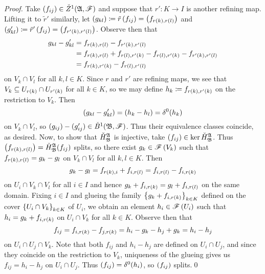 \documentclass[../Moduli_Spaces_of_Riemann_Surfaces.tex]{subfiles}
\begin{document}
    \begin{proof}
        Take $\left(f_{ij}\right)\in\check{Z}^1\!\left(\mathfrak{A},\mathscr{F}\right)$ and suppose that $r':K\to I$ is another refining map. Lifting it to $\tilde{r}'$ similarly, let $\left(g_{kl}\right)\coloneqq\tilde{r}\left(f_{ij}\right)=\left(f_{r\left(k\right),r\left(l\right)}\right)$ and $(g'_{kl})\coloneqq\tilde{r}'\left(f_{ij}\right)=\left(f_{r'\left(k\right),r'\left(l\right)}\right)$. Observe then that
        \begin{equation*}
            \begin{aligned}
                g_{kl}-g_{kl}'&=f_{r\left(k\right),r\left(l\right)}-f_{r'\left(k\right),r'\left(l\right)} \\
                              &=f_{r\left(k\right),r\left(l\right)}+f_{r\left(l\right),r'\left(k\right)}-f_{r\left(l\right),r'\left(k\right)}-f_{r'\left(k\right),r'\left(l\right)} \\
                              &=f_{r\left(k\right),r'\left(k\right)}-f_{r\left(l\right),r'\left(l\right)}
            \end{aligned}
        \end{equation*}
        on $V_k\cap V_l$ for all $k,l\in K$. Since $r$ and $r'$ are refining maps, we see that $V_k\subseteq U_{r\left(k\right)}\cap U_{r'\left(k\right)}$ for all $k\in K$, so we may define $h_k\coloneqq f_{r\left(k\right),r'\left(k\right)}$ on the restriction to $V_k$. Then
        \begin{equation*}
            \left(g_{kl}-g_{kl}'\right)=\left(h_k-h_l\right)=\delta^0\!\left(h_k\right)
        \end{equation*}
        on $V_k\cap V_l$, so $\left(g_{ij}\right)-(g_{ij}')\in\check{B}^1\!\left(\mathfrak{B},\mathscr{F}\right)$. Thus their equivalence classes coincide, as desired. Now, to show that $\check{H}_{\mathfrak{B}}^{\mathfrak{A}}$ is injective, take $\left(f_{ij}\right)\in\ker\check{H}_{\mathfrak{B}}^{\mathfrak{A}}$. Thus $\left(f_{r\left(k\right),r\left(l\right)}\right)=\check{H}_{\mathfrak{B}}^{\mathfrak{A}}\!\left(f_{ij}\right)$ splits, so there exist $g_k\in\mathscr{F}\left(V_k\right)$ such that $f_{r\left(k\right),r\left(l\right)}=g_k-g_l$ on $V_k\cap V_l$ for all $k,l\in K$. Then
        \begin{equation*}
            g_k-g_l=f_{r\left(k\right),i}+f_{i,r\left(l\right)}=f_{i,r\left(l\right)}-f_{i,r\left(k\right)}
        \end{equation*}
        on $U_i\cap V_k\cap V_l$ for all $i\in I$ and hence $g_k+f_{i,r\left(k\right)}=g_l+f_{i,r\left(l\right)}$ on the same domain. Fixing $i\in I$ and glueing the family $\left\{g_k+f_{i,r\left(k\right)}\right\}_{k\in K}$ defined on the cover $\left\{U_i\cap V_k\right\}_{k\in K}$ of $U_i$, we obtain an element $h_i\in\mathscr{F}\left(U_i\right)$ such that $h_i=g_k+f_{i,r\left(k\right)}$ on $U_i\cap V_k$ for all $k\in K$. Observe then that
        \begin{equation*}
            f_{ij}=f_{i,r\left(k\right)}-f_{j,r\left(k\right)}=h_i-g_k-h_j+g_k=h_i-h_j
        \end{equation*}
        on $U_i\cap U_j\cap V_k$. Note that both $f_{ij}$ and $h_i-h_j$ are defined on $U_i\cap U_j$, and since they coincide on the restriction to $V_k$, uniqueness of the glueing gives us $f_{ij}=h_i-h_j$ on $U_i\cap U_j$. Thus $\left(f_{ij}\right)=\delta^0\!\left(h_i\right)$, so $\left(f_{ij}\right)$ splits.\qed
    \end{proof}
\end{document}
